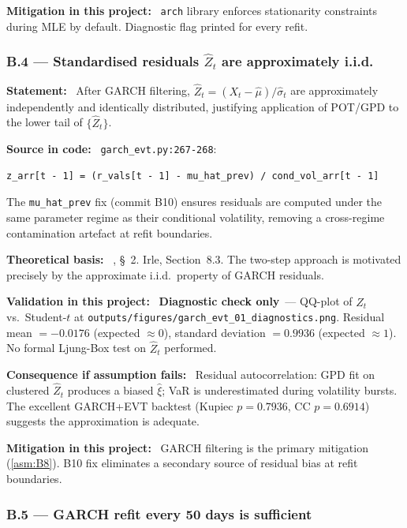 \documentclass[11pt,a4paper]{article}
\newcommand{\asmfield}[1]{\medskip\noindent\textbf{#1:}\ }
\newcommand{\code}[1]{\texttt{#1}}
\newcommand{\diagnostic}{\textbf{Diagnostic check only}}
\begin{document}
\asmfield{Mitigation in this project}
\code{arch} library enforces stationarity constraints during MLE by
default. Diagnostic flag printed for every refit.

\subsubsection{B.4 --- Standardised residuals $\hat{Z}_t$ are approximately i.i.d.}\label{asm:B4}

\asmfield{Statement}
After GARCH filtering, $\hat{Z}_t = (X_t - \hat{\mu})/\hat{\sigma}_t$
are approximately independently and identically distributed, justifying
application of POT/GPD to the lower tail of $\{\hat{Z}_t\}$.

\asmfield{Source in code}
\code{garch\_evt.py:267-268}:
\begin{lstlisting}
z_arr[t - 1] = (r_vals[t - 1] - mu_hat_prev) / cond_vol_arr[t - 1]
\end{lstlisting}
The \code{mu\_hat\_prev} fix (commit B10) ensures residuals are computed
under the same parameter regime as their conditional volatility, removing
a cross-regime contamination artefact at refit boundaries.

\asmfield{Theoretical basis}
\cite{McNeilFrey2000}, \S~2. Irle, Section~8.3. The two-step approach is
motivated precisely by the approximate i.i.d.\ property of GARCH residuals.

\asmfield{Validation in this project}
\diagnostic\ --- QQ-plot of $\hat{Z}_t$ vs.\ Student-$t$ at
\code{outputs/figures/garch\_evt\_01\_diagnostics.png}. Residual mean
$= -0.0176$ (expected $\approx 0$), standard deviation $= 0.9936$
(expected $\approx 1$). No formal Ljung-Box test on $\hat{Z}_t$ performed.

\asmfield{Consequence if assumption fails}
Residual autocorrelation: GPD fit on clustered $\hat{Z}_t$ produces a
biased $\hat{\xi}$; VaR is underestimated during volatility bursts. The
excellent GARCH+EVT backtest (Kupiec $p = 0.7936$, CC $p = 0.6914$)
suggests the approximation is adequate.

\asmfield{Mitigation in this project}
GARCH filtering is the primary mitigation (\cref{asm:B8}). B10 fix
eliminates a secondary source of residual bias at refit boundaries.

\subsubsection{B.5 --- GARCH refit every 50 days is sufficient}\label{asm:B5}
\end{document}

